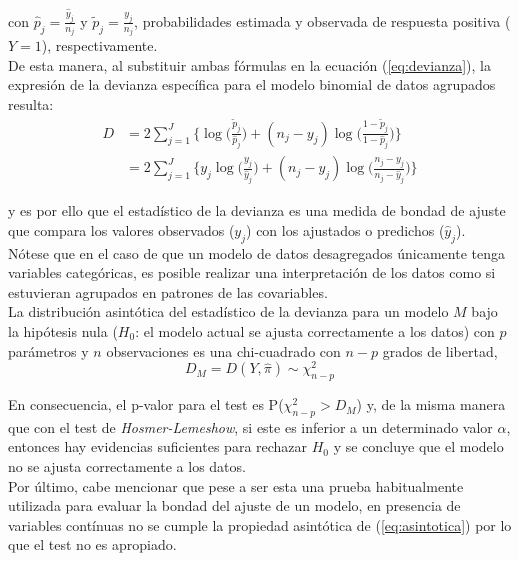con $\hat{p}_j= \frac{\hat{y}_j}{n_j}$ y $\tilde{p}_j= \frac{y_j}{n_j}$, probabilidades estimada y observada de respuesta positiva ($Y=1$), respectivamente.\\

De esta manera, al substituir ambas fórmulas en la ecuación (\ref{eq:devianza}), la expresión de la devianza específica para el modelo binomial de datos agrupados resulta:
 \begin{align*}
D
&=2 \sum_{j=1}^{J}\Big\{ \log\Big( \frac{\tilde{p}_j}{\hat{p}_j}\Big)+(n_j-y_j)\log\Big( \frac{1-\tilde{p}_j}{1-\hat{p}_j}\Big)\Big\}\\
&=2 \sum_{j=1}^{J}\Big\{ y_j \log\Big( \frac{y_j}{\hat{y}_j}\Big)+(n_j-y_j)\log\Big( \frac{n_j-y_j}{n_j-\hat{y}_j}\Big)\Big\}
\end{align*}

y es por ello que el estadístico de la devianza es una medida de bondad de ajuste que compara los valores observados ($y_j$) con los ajustados o predichos ($\hat{y}_j$). \\

Nótese que en el caso de que un modelo de datos desagregados únicamente tenga variables categóricas, es posible realizar una interpretación de los datos como si estuvieran agrupados en patrones de las covariables.\\

La distribución asintótica del estadístico de la devianza para un modelo $M$ bajo la hipótesis nula ($H_0$: el modelo actual se ajusta correctamente a los datos) con $p$ parámetros y $n$ observaciones es una chi-cuadrado con $n-p$ grados de libertad,
 \begin{equation}
\label{eq:asintotica}
D_M=D(Y, \hat{\pi}) \sim \chi^2_{n-p}
\end{equation}

En consecuencia, el p-valor para el test es P($ \chi^2_{n-p} > D_M$) y, de la misma manera que con el test de \textit{Hosmer-Lemeshow}, si este es inferior a un determinado valor $\alpha$, entonces hay evidencias suficientes para rechazar $H_0$ y se concluye que el modelo no se ajusta correctamente a los datos. \\

Por último, cabe mencionar que pese a ser esta una prueba habitualmente utilizada para evaluar la bondad del ajuste de un modelo, en presencia de variables contínuas no se cumple la propiedad asintótica de (\ref{eq:asintotica}) por lo que el test no es apropiado.


